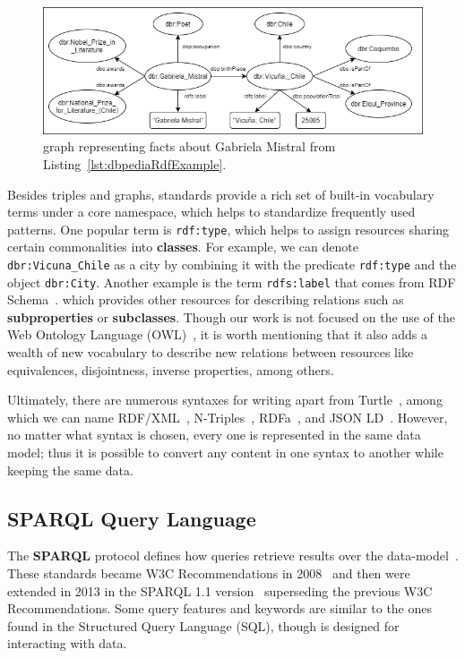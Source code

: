 \begin{figure}[!h]
    \centering
    \includegraphics[scale=.55]{imagenes/2_theorical_framework/exampleDbpediaGraph.png}
    \caption{\RDF{} graph representing facts about Gabriela Mistral from Listing~\ref{lst:dbpediaRdfExample}.}
    \label{fig:dbpediaGraphExample}
\end{figure}

Besides \RDF{} triples and \RDF{} graphs, \RDF{} standards provide a rich set of built-in 
vocabulary terms under a core \RDF{} namespace, which helps to standardize frequently used 
\RDF{} patterns. One popular term is \texttt{rdf:type}, which helps to assign resources 
sharing certain commonalities into \textbf{classes}. For example, we can denote 
\texttt{dbr:Vicuna\_Chile} as a city by combining it with the predicate \texttt{rdf:type} 
and the object \texttt{dbr:City}. Another example is the term \texttt{rdfs:label} that 
comes from RDF Schema~\cite{key:rdfsold}. which provides other resources for describing 
relations such as \textbf{subproperties} or \textbf{subclasses}. Though our work is not 
focused on the use of the Web Ontology Language (OWL)~\cite{key:owl2rationale, key:owloverview}, 
it is worth mentioning that it also adds a wealth of new vocabulary to describe new 
relations between resources like equivalences, disjointness, inverse properties, among others.

Ultimately, there are numerous syntaxes for writing \RDF{} apart from Turtle~\cite{key:turtle}, among 
which we can name RDF/XML~\cite{key:rdfxml}, N-Triples~\cite{key:testcases}, RDFa~\cite{key:rdfa11p, key:rdfa}, 
and JSON LD~\cite{key:jsonld}. However, no matter what syntax is chosen, every one is 
represented in the same \RDF{} data model; thus it is possible to convert any \RDF{} content 
in one syntax to another while keeping the same \RDF{} data.

\subsection{SPARQL Query Language}
\label{cap2:semWeb/sparql}
The \textbf{SPARQL} protocol defines how \SPARQL{} queries retrieve results over the \RDF{} 
data-model~\cite{key:sparql11protocol}. These standards became W3C Recommendations in 
2008~\cite{key:sparql} and then were extended in 2013 in the SPARQL 1.1 version~\cite{key:sparql11} 
superseding the previous W3C Recommendations. Some \SPARQL{} query features and keywords are similar 
to the ones found in the Structured Query Language (SQL), though \SPARQL{} is designed for interacting 
with \RDF{} data.

